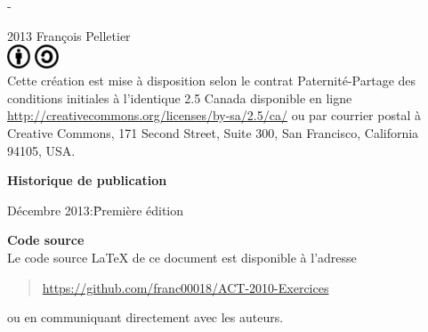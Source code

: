 \begingroup
\calccentering{\unitlength}
\begin{adjustwidth*}{\unitlength}{-\unitlength}
  \small
  \setlength{\parindent}{0pt}
  \setlength{\parskip}{\baselineskip}

  {\textcopyright} 2013 François Pelletier \\


  \includegraphics[height=7mm,keepaspectratio=true]{by}\;%
  \includegraphics[height=7mm,keepaspectratio=true]{sa} \\
  Cette création est mise à disposition selon le contrat
  Paternité-Partage des conditions initiales à l'identique 2.5 Canada
  disponible en ligne
  \url{http://creativecommons.org/licenses/by-sa/2.5/ca/} ou par
  courrier postal à Creative Commons, 171 Second Street, Suite 300,
  San Francisco, California 94105, USA.

  \textbf{Historique de publication}
  \vspace{-\baselineskip}
  \begin{tabbing}
    Décembre 2013:\quad\= Première édition
  \end{tabbing}

  \textbf{Code source} \\
  Le code source {\LaTeX} de ce document est disponible à l'adresse
  \begin{quote}
    \url{https://github.com/franc00018/ACT-2010-Exercices}
  \end{quote}
  ou en communiquant directement avec les auteurs.

  \vspace{1cm}

\end{adjustwidth*}
\endgroup

\renewcommand{\sfdefault}{phv}

\clearpage

